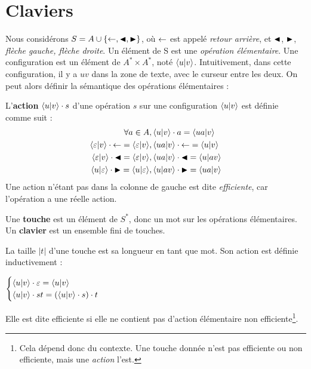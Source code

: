 \documentclass[12pt, a4paper]{article}
\begin{document}
    \section{Claviers}
    Nous considérons $S = A \cup \{\mathord{\leftarrow}, \mathord{\blacktriangleleft}, \mathord{\blacktriangleright}\}$, où $\mathord{\leftarrow}$ est appelé \emph{retour arrière}, et $\mathord{\blacktriangleleft}$, $\mathord{\blacktriangleright}$, \emph{flèche gauche, flèche droite}.
    Un élément de S est une \emph{opération élémentaire}.
    Une configuration est un élément de $A^* \times A^*$, noté $\left\langle u \middle| v \right\rangle$. Intuitivement, dans cette configuration, il y a $uv$ dans la zone de texte, avec le curseur entre les deux.
    On peut alors définir la sémantique des opérations élémentaires :
    \begin{semopel}
        L'\textbf{action} $\left\langle u \middle| v \right\rangle\cdot s$ d'une opération $s$ sur une configuration $\left\langle u \middle| v \right\rangle$ est définie comme suit :
        \begin{align*}
            \forall a \in A&, \left\langle u \middle| v \right\rangle\cdot a = \left\langle ua \middle| v \right\rangle \\
            \left\langle \varepsilon \middle| v \right\rangle\cdot \mathord{\leftarrow} = \left\langle \varepsilon \middle| v \right\rangle &, \left\langle ua \middle| v \right\rangle\cdot \mathord{\leftarrow} = \left\langle u \middle| v \right\rangle \\
            \left\langle \varepsilon \middle| v \right\rangle\cdot \mathord{\blacktriangleleft} = \left\langle \varepsilon \middle| v \right\rangle &, \left\langle ua \middle| v \right\rangle\cdot \mathord{\blacktriangleleft} = \left\langle u \middle| av \right\rangle \\
            \left\langle u \middle| \varepsilon \right\rangle\cdot \mathord{\blacktriangleright} = \left\langle u \middle| \varepsilon \right\rangle &, \left\langle u \middle| av \right\rangle\cdot \mathord{\blacktriangleright} = \left\langle ua \middle| v \right\rangle \\
        \end{align*}
        Une action n'étant pas dans la colonne de gauche est dite \emph{efficiente}, car l'opération a une réelle action.
    \end{semopel}
    \begin{clavier}
        Une \textbf{touche} est un élément de $S^*$, donc un mot sur les opérations élémentaires. \\
        Un \textbf{clavier} est un ensemble fini de touches.
    \end{clavier}
    La taille $|t|$ d'une touche est sa longueur en tant que mot. Son action est définie inductivement :

    $\begin{cases}
        \left\langle u \middle| v \right\rangle\cdot \varepsilon = \left\langle u \middle| v \right\rangle \\
        \left\langle u \middle| v \right\rangle\cdot st = (\left\langle u \middle| v \right\rangle\cdot s) \cdot t
    \end{cases}$

    Elle est dite efficiente si elle ne contient pas d'action élémentaire non efficiente\footnote{Cela dépend donc du contexte. Une touche donnée n'est pas efficiente ou non efficiente, mais une \emph{action} l'est.}.
\end{document}
